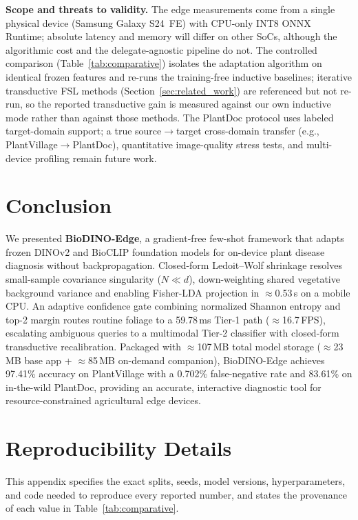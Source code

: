 \documentclass[preprint,12pt]{elsarticle}
\begin{document}
\textbf{Scope and threats to validity.} The edge measurements come from a single physical device (Samsung Galaxy S24~FE) with CPU-only INT8 ONNX Runtime; absolute latency and memory will differ on other SoCs, although the algorithmic cost and the delegate-agnostic pipeline do not. The controlled comparison (Table~\ref{tab:comparative}) isolates the adaptation algorithm on identical frozen features and re-runs the training-free inductive baselines; iterative transductive FSL methods (Section~\ref{sec:related_work}) are referenced but not re-run, so the reported transductive gain is measured against our own inductive mode rather than against those methods. The PlantDoc protocol uses labeled target-domain support; a true source$\rightarrow$target cross-domain transfer (e.g., PlantVillage$\rightarrow$PlantDoc), quantitative image-quality stress tests, and multi-device profiling remain future work.

\section{Conclusion}
\label{sec:conclusion}
We presented \textbf{BioDINO-Edge}, a gradient-free few-shot framework that adapts frozen DINOv2 and BioCLIP foundation models for on-device plant disease diagnosis without backpropagation. Closed-form Ledoit--Wolf shrinkage resolves small-sample covariance singularity ($N \ll d$), down-weighting shared vegetative background variance and enabling Fisher-LDA projection in $\approx$0.53\,s on a mobile CPU. An adaptive confidence gate combining normalized Shannon entropy and top-2 margin routes routine foliage to a 59.78\,ms Tier-1 path ($\approx$16.7\,FPS), escalating ambiguous queries to a multimodal Tier-2 classifier with closed-form transductive recalibration. Packaged with $\approx$107\,MB total model storage ($\approx$23\,MB base app + $\approx$85\,MB on-demand companion), BioDINO-Edge achieves 97.41\% accuracy on PlantVillage with a 0.702\% false-negative rate and 83.61\% on in-the-wild PlantDoc, providing an accurate, interactive diagnostic tool for resource-constrained agricultural edge devices.

\appendix
\section{Reproducibility Details}
\label{app:repro}
This appendix specifies the exact splits, seeds, model versions, hyperparameters, and code needed to reproduce every reported number, and states the provenance of each value in Table~\ref{tab:comparative}.
\end{document}
